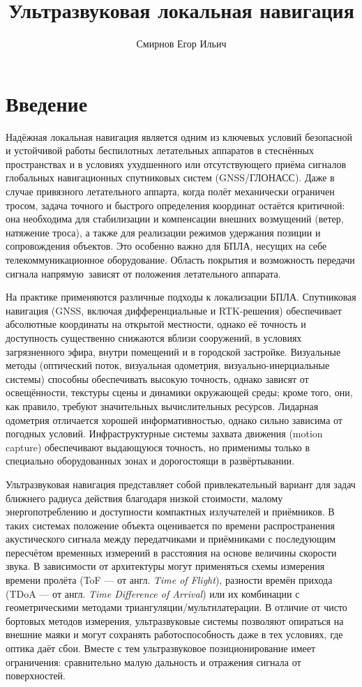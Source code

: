 \documentclass[a4paper,11pt]{article} %
\title{Ультразвуковая локальная навигация}
\author{Смирнов Егор Ильич}
\date{}
\begin{document}
\maketitle %

\section{Введение}
Надёжная локальная навигация является одним из ключевых условий безопасной и устойчивой работы беспилотных летательных
  аппаратов в стеснённых пространствах и в условиях ухудшенного или отсутствующего приёма сигналов глобальных
  навигационных спутниковых систем (GNSS/ГЛОНАСС). Даже в случае привязного летательного аппарта, когда полёт 
  механически ограничен тросом, задача точного и быстрого определения координат остаётся критичной: 
  она необходима для стабилизации и компенсации внешних возмущений (ветер, натяжение троса), 
  а также для реализации режимов удержания позиции и сопровождения объектов. Это особенно важно для БПЛА,
  несущих на себе телекоммуникационное оборудование. Область покрытия и возможность передачи сигнала напрямую\
  зависят от положения летательного аппарата.

На практике применяются различные подходы к локализации БПЛА. Спутниковая навигация
 (GNSS, включая дифференциальные и RTK-решения) обеспечивает абсолютные координаты на открытой местности,
  однако её точность и доступность существенно снижаются вблизи сооружений, в условиях загрязненного эфира, 
  внутри помещений и в городской застройке. 
  Визуальные методы (оптический поток, визуальная одометрия,
  визуально-инерциальные системы) способны обеспечивать высокую точность, однако зависят от освещённости, текстуры сцены
  и динамики окружающей среды; кроме того, они, как правило, требуют значительных вычислительных ресурсов.
  Лидарная одометрия отличается хорошей информативностью, однако сильно зависима от погодных условий.
  Инфраструктурные системы захвата движения (motion capture) 
  обеспечивают выдающуюся точность, но применимы только в специально оборудованных зонах и дорогостоящи в развёртывании.

Ультразвуковая навигация представляет собой привлекательный вариант для задач ближнего радиуса действия 
благодаря низкой стоимости, малому энергопотреблению и доступности компактных излучателей и приёмников. 
В таких системах положение объекта оценивается по времени распространения акустического сигнала между передатчиками 
и приёмниками с последующим пересчётом временных измерений в расстояния на основе величины скорости звука.
В зависимости от архитектуры могут применяться схемы измерения времени пролёта (ToF --- от англ. \textit{Time of Flight}),
разности времён прихода (TDoA --- от англ. \textit{Time Difference of Arrival})
или их комбинации с геометрическими методами триангуляции/мультилатерации.
В отличие от чисто бортовых методов измерения, ультразвуковые системы позволяют опираться на внешние маяки
и могут сохранять работоспособность даже в тех условиях, где оптика даёт сбои.
Вместе с тем ультразвуковое позиционирование имеет ограничения:
сравнительно малую дальность и отражения сигнала от поверхностей.
\end{document}
